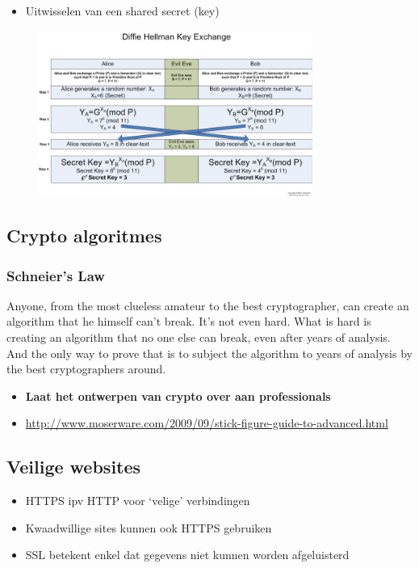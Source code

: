 \documentclass{article}
\newcommand{\bold}[1]{\textbf{#1}}
\begin{document}
\begin{itemize}
    \item Uitwisselen van een shared secret (key)
\end{itemize}

\begin{figure}[H]
    \centering
    \includegraphics[width=0.8\textwidth]{diffie-hellman.png}
    \caption{}
\end{figure}

\subsection{Crypto algoritmes}

\subsubsection{Schneier's Law}

Anyone, from the most clueless amateur to the best cryptographer, 
can create an algorithm that he himself can't break. 
It's not even hard. What is hard is creating an algorithm that no one else can break, 
even after years of analysis. 
And the only way to prove that is to subject the algorithm to years of analysis by the best cryptographers around.


\begin{itemize}
    \item \bold{Laat het ontwerpen van crypto over aan professionals}
    \item \url{http://www.moserware.com/2009/09/stick-figure-guide-to-advanced.html}
\end{itemize}

\subsection{Veilige websites}

\begin{itemize}
    \item HTTPS ipv HTTP voor `velige' verbindingen
    \item Kwaadwillige sites kunnen ook HTTPS gebruiken
    \item SSL betekent enkel dat gegevens niet kunnen worden afgeluisterd
\end{itemize}
\end{document}

